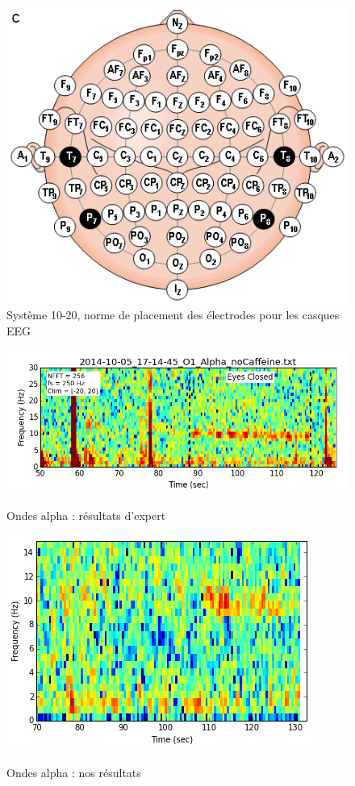 \documentclass[11pt,a4paper]{article}
\theoremstyle{plain}
\theoremstyle{definition}
\begin{document}
\begin{figure}[h!]
\centering
\includegraphics[scale=0.4]{1020.png}
\caption{Système 10-20, norme de placement des électrodes pour les casques EEG}
\label{dix}
\end{figure}

\begin{figure}[h!]
\centering

\caption{Ondes alpha : résultats d'expert}
\includegraphics[scale=0.5]{eeghackerAlpha.png}
\label{eeghack}%
\end{figure}
\begin{figure}[h!]
\centering

\caption{Ondes alpha : nos résultats}
\includegraphics[scale=0.5]{ourAlpha.png}
\label{ouralph}%
\end{figure}
\end{document}
